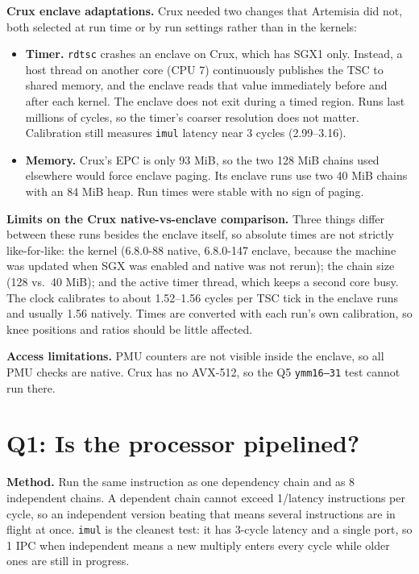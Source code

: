 \documentclass[10pt]{article}
\newcommand{\code}[1]{\texttt{#1}}
\begin{document}
\textbf{Crux enclave adaptations.} Crux needed two changes that Artemisia did not, both selected at run time or by run settings rather than in the kernels:
\begin{itemize}
\item \textbf{Timer.} \code{rdtsc} crashes an enclave on Crux, which has SGX1 only. Instead, a host thread on another core (CPU 7) continuously publishes the TSC to shared memory, and the enclave reads that value immediately before and after each kernel. The enclave does not exit during a timed region. Runs last millions of cycles, so the timer's coarser resolution does not matter. Calibration still measures \code{imul} latency near 3 cycles (2.99--3.16).
\item \textbf{Memory.} Crux's EPC is only 93 MiB, so the two 128 MiB chains used elsewhere would force enclave paging. Its enclave runs use two 40 MiB chains with an 84 MiB heap. Run times were stable with no sign of paging.
\end{itemize}

\textbf{Limits on the Crux native-vs-enclave comparison.} Three things differ between these runs besides the enclave itself, so absolute times are not strictly like-for-like:
the kernel (6.8.0-88 native, 6.8.0-147 enclave, because the machine was updated when SGX was enabled and native was not rerun); the chain size (128 vs.\ 40 MiB); and the active timer thread, which keeps a second core busy. The clock calibrates to about 1.52--1.56 cycles per TSC tick in the enclave runs and usually 1.56 natively. Times are converted with each run's own calibration, so knee positions and ratios should be little affected.

\textbf{Access limitations.} PMU counters are not visible inside the enclave, so all PMU checks are native. Crux has no AVX-512, so the
Q5 \code{ymm16--31} test cannot run there.

\section{Q1: Is the processor pipelined?}
\textbf{Method.} Run the same instruction as one dependency chain and as 8 independent chains. A dependent chain
cannot exceed 1/latency instructions per cycle, so an independent version beating that means several instructions
are in flight at once. \code{imul} is the cleanest test: it has 3-cycle latency and a single port, so 1 IPC when
independent means a new multiply enters every cycle while older ones are still in progress.
\end{document}
